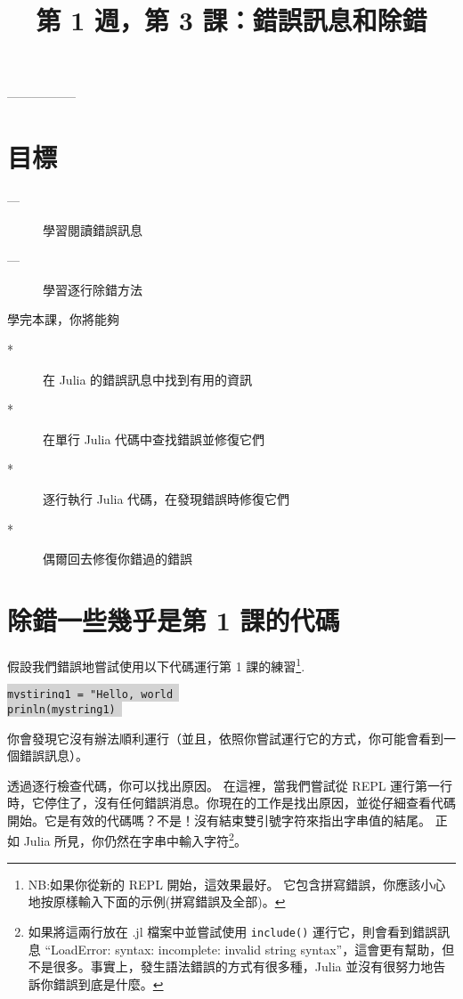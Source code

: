 \documentclass[]{article}
\newcommand{\codequote}[1]{\colorbox{lightgray}{\tt #1}}
\begin{document}
\author{}  \date{}
\title{第 1 週，第 3 課：錯誤訊息和除錯}
\maketitle

\vspace{-2cm}
-----------------

\section*{目標}
{\large
\begin{description}
	\item[---] 學習閱讀錯誤訊息
	\item[---] 學習逐行除錯方法
\end{description}
}
學完本課，你將能夠
\begin{description}
	\item[*] 在 Julia 的錯誤訊息中找到有用的資訊
	\item[*] 在單行 Julia 代碼中查找錯誤並修復它們
	\item[*] 逐行執行 Julia 代碼，在發現錯誤時修復它們
	\item[*] 偶爾回去修復你錯過的錯誤
\end{description}

\section*{除錯一些幾乎是第 1 課的代碼}

假設我們錯誤地嘗試使用以下代碼運行第 1 課的練習\footnote{NB:如果你從新的 REPL 開始，這效果最好。 它包含拼寫錯誤，你應該小心地按原樣輸入下面的示例(拼寫錯誤及全部)。}.

\codequote{mystiring1 = "Hello, world  }\\
\codequote{prinln(mystring1) }

你會發現它沒有辦法順利運行（並且，依照你嘗試運行它的方式，你可能會看到一個錯誤訊息）。

透過逐行檢查代碼，你可以找出原因。 在這裡，當我們嘗試從 REPL 運行第一行時，它停住了，沒有任何錯誤消息。你現在的工作是找出原因，並從仔細查看代碼開始。它是有效的代碼嗎？不是！沒有結束雙引號字符來指出字串值的結尾。 正如 Julia 所見，你仍然在字串中輸入字符\footnote{如果將這兩行放在 .jl 檔案中並嘗試使用 {\tt include()} 運行它，則會看到錯誤訊息
“LoadError: syntax: incomplete: invalid string syntax”，這會更有幫助，但不是很多。事實上，發生語法錯誤的方式有很多種，Julia 並沒有很努力地告訴你錯誤到底是什麼。}。
\end{document}
